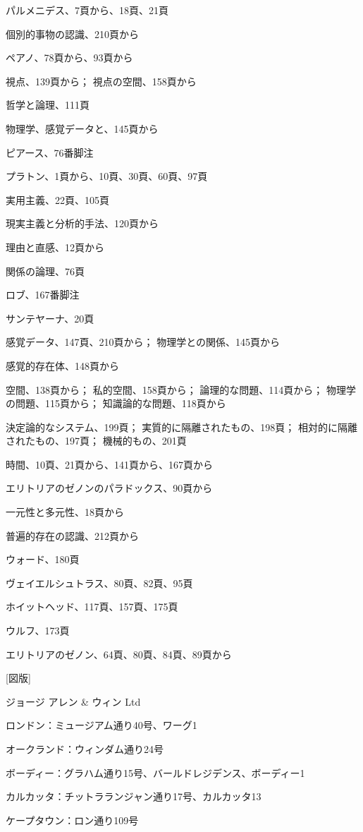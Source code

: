 \documentclass[a4paper,11pt,openany]{ltjsbook}
\begin{document}
パルメニデス、7頁から、18頁、21頁

個別的事物の認識、210頁から

ペアノ、78頁から、93頁から

視点、139頁から；
  視点の空間、158頁から

哲学と論理、111頁

物理学、感覚データと、145頁から

ピアース、76番脚注


プラトン、1頁から、10頁、30頁、60頁、97頁

実用主義、22頁、105頁


現実主義と分析的手法、120頁から

理由と直感、12頁から

関係の論理、76頁

ロブ、167番脚注


サンテヤーナ、20頁

感覚データ、147頁、210頁から；
  物理学との関係、145頁から

感覚的存在体、148頁から

空間、138頁から；
  私的空間、158頁から；
  論理的な問題、114頁から；
  物理学の問題、115頁から；
  知識論的な問題、118頁から

決定論的なシステム、199頁；
  実質的に隔離されたもの、198頁；
  相対的に隔離されたもの、197頁；
  機械的もの、201頁


時間、10頁、21頁から、141頁から、167頁から

エリトリアのゼノンのパラドックス、90頁から


一元性と多元性、18頁から

普遍的存在の認識、212頁から


ウォード、180頁


ヴェイエルシュトラス、80頁、82頁、95頁

ホイットヘッド、117頁、157頁、175頁

ウルフ、173頁


エリトリアのゼノン、64頁、80頁、84頁、89頁から


[図版]

ジョージ アレン \& ウィン Ltd

ロンドン：ミュージアム通り40号、ワーグ1

オークランド：ウィンダム通り24号

ボーディー：グラハム通り15号、バールドレジデンス、ボーディー1

カルカッタ：チットラランジャン通り17号、カルカッタ13

ケープタウン：ロン通り109号
\end{document}
